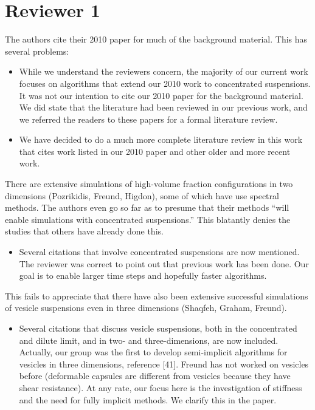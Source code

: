 \documentclass[11pt]{article}
\newcommand{\comment}[1]{{\color{blue} #1}}
\begin{document}
\section*{Reviewer 1}

\comment{The authors cite their 2010 paper for much of the background
material.  This has several problems:}
\begin{itemize}
  \item While we understand the reviewers concern, the majority of our
  current work focuses on algorithms that extend our 2010 work to
  concentrated suspensions.  It was not our intention to cite our 2010
  paper for the background material.  We did state that the literature
  had been reviewed in our previous work, and we referred the readers
  to these papers for a formal literature review.

  \item We have decided to do a much more complete literature review
  in this work that cites work listed in our 2010 paper and other
  older and more recent work.
\end{itemize}

\comment{
There are extensive simulations of high-volume fraction
configurations in two dimensions (Pozrikidis, Freund, Higdon), some of
which have use spectral methods. The authors even go so far as to
presume that their methods ``will enable simulations with concentrated
suspensions.'' This blatantly denies the studies that others have
already done this.}
\begin{itemize}
  \item Several citations that involve concentrated suspensions are
  now mentioned. The reviewer was correct to point out that previous
  work has been done. Our goal is to enable larger time steps and
  hopefully faster algorithms. 
\end{itemize}

\comment{This fails to appreciate that there have also been extensive
successful simulations of vesicle suspensions even in three dimensions
(Shaqfeh, Graham, Freund).}
\begin{itemize}
  \item Several citations that discuss vesicle suspensions, both in
  the concentrated and dilute limit, and in two- and three-dimensions,
  are now included. Actually, our group was the first to develop
  semi-implicit algorithms for vesicles in three dimensions, reference
  [41].  Freund has not worked on vesicles before (deformable capsules
  are different from vesicles because they have shear resistance). At
  any rate, our focus here is the investigation of stiffness and the
  need for fully implicit methods. We clarify this in the paper.
\end{itemize}
\end{document}
